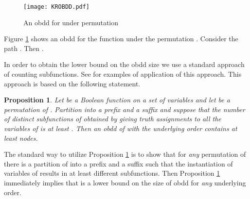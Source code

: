 \documentclass{article}
\newtheorem{proposition}{Proposition}
\begin{document}
\begin{figure}[h]
\centering 
\texttt{[image: KROBDD.pdf]}
\caption{An {\sc obdd} for 
under permutation }
\label{OBDDPic}
\end{figure}

Figure \ref{OBDDPic} shows an {\sc obdd} for the function 
under the permutation . Consider the path . 
Then . 

\begin{comment}
Consider an arbitrary internal vertex of , not necessarily the root and let
 be the induced subgraph of  (retaining the labeling on vertices and edges) consisting of all vertices reachable
from . It is not hard to see that  is an {\sc obdd}. Moreover, let  be a path from the root of  to .
Then it is not hard to see that the function  represented by  if . This observation implies
a corollary leading to a widely used approach to establishing lower bounds on {\sc obdds}, 
\end{comment}

In order to obtain the lower bound on the {\sc obdd} size we use a standard approach
of counting subfunctions. See \cite{WegBook} for examples of application of this approach.
This approach is based on the following statement.

\begin{proposition} \label{paths}
Let  be a Boolean function on a set  of variables and let  be a permutation
of . Partition  into a prefix 
and a suffix  and suppose that the number of distinct subfunctions of  obtained by giving
truth assignments to all the variables of  is at least . Then an {\sc obdd} of  with
the underlying order  contains at least  nodes. 
\end{proposition}

The standard way to utilize Proposition \ref{paths} is to show that for \emph{any} permutation
 of  there is a partition of  into a prefix  and a suffix  such that
the instantiation of variables of  results in at least  different subfunctions.
Then Proposition \ref{paths} immediately implies that  is a lower bound on the size of {\sc obdd}
for \emph{any} underlying order.

\begin{comment}
\begin{proposition} \label{paths}
Let  and  be  computational paths of  such that  Then 
 and  have distinct final vertices. 
\end{proposition}

It immediately follows from Proposition \ref{paths} that if there are computational paths  
such that  are pairwise distinct then  has at least  vertices. 
If  is superpolynomial compared
to the number of variables  then this means that a superpolynomial lower bound has been established.
\footnote{This is a slight modification of the approach used in \cite{OBDDComp} (Lemma 2). 
The set  is called in \cite{OBDDComp}
a \emph{fooling set} of the considered {\sc obdd}.}
\end{comment}
\end{document}
